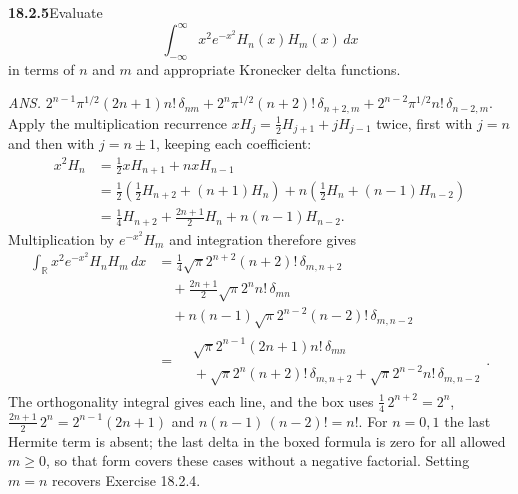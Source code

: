 \par\bigskip
\noindent\textbf{18.2.5}\quad Evaluate
\[
\int_{-\infty}^{\infty}x^{2}e^{-x^{2}}H_{n}(x)H_{m}(x)\,dx
\]
in terms of $n$ and $m$ and appropriate Kronecker delta functions.
\par\nobreak\hfill\emph{ANS.}\enspace
$2^{n-1}\pi^{1/2}(2n+1)n!\,\delta_{nm}
+2^{n}\pi^{1/2}(n+2)!\,\delta_{n+2,m}
+2^{n-2}\pi^{1/2}n!\,\delta_{n-2,m}$.
\solution
Apply the multiplication recurrence $xH_j=\frac12H_{j+1}+jH_{j-1}$
twice, first with $j=n$ and then with $j=n\pm1$, keeping each
coefficient:
\begin{align*}
x^2H_n
 &=\tfrac12xH_{n+1}+nxH_{n-1}\\
 &=\tfrac12\left(\tfrac12H_{n+2}+(n+1)H_n\right)
   +n\left(\tfrac12H_n+(n-1)H_{n-2}\right)\\
 &=\tfrac14H_{n+2}+\tfrac{2n+1}{2}H_n+n(n-1)H_{n-2}.
\end{align*}
Multiplication by $e^{-x^2}H_m$ and integration therefore gives
\begin{align*}
\int_{\mathbb R}x^2e^{-x^2}H_nH_m\,dx
 &=\tfrac14\sqrt\pi2^{n+2}(n+2)!\,\delta_{m,n+2}\\
 &\quad+\tfrac{2n+1}{2}\sqrt\pi2^nn!\,\delta_{mn}\\
 &\quad+n(n-1)\sqrt\pi2^{n-2}(n-2)!\,\delta_{m,n-2}\\
 &=\boxed{\begin{aligned}
 &\sqrt\pi2^{n-1}(2n+1)n!\,\delta_{mn}\\
 &{}+\sqrt\pi2^n(n+2)!\,\delta_{m,n+2}
   +\sqrt\pi2^{n-2}n!\,\delta_{m,n-2}
 \end{aligned}}.
\end{align*}
The orthogonality integral gives each line, and the box uses
$\tfrac14\,2^{n+2}=2^n$, $\tfrac{2n+1}{2}\,2^n=2^{n-1}(2n+1)$ and
$n(n-1)\,(n-2)!=n!$.
For $n=0,1$ the last Hermite term is absent; the last delta in the
boxed formula is zero for all allowed $m\ge0$, so that form covers
these cases without a negative factorial.  Setting $m=n$ recovers
Exercise 18.2.4.

